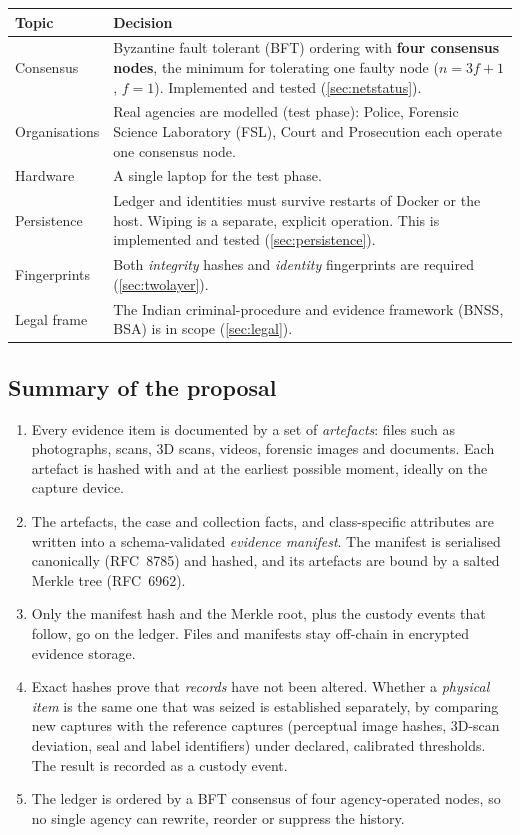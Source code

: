 \begin{center}
\begin{tabularx}{\linewidth}{@{}lX@{}}
\toprule
Topic & Decision \\
\midrule
Consensus & Byzantine fault tolerant (BFT) ordering with \textbf{four consensus nodes}, the minimum for tolerating one faulty node ($n = 3f+1$, $f=1$). Implemented and tested (\cref{sec:netstatus}). \\
Organisations & Real agencies are modelled (test phase): Police, Forensic Science Laboratory (FSL), Court and Prosecution each operate one consensus node. \\
Hardware & A single laptop for the test phase. \\
Persistence & Ledger and identities must survive restarts of Docker or the host. Wiping is a separate, explicit operation. This is implemented and tested (\cref{sec:persistence}). \\
Fingerprints & Both \emph{integrity} hashes and \emph{identity} fingerprints are required (\cref{sec:twolayer}). \\
Legal frame & The Indian criminal-procedure and evidence framework (BNSS, BSA) is in scope (\cref{sec:legal}). \\
\bottomrule
\end{tabularx}
\end{center}

\subsection{Summary of the proposal}
\begin{keypoint}
\begin{enumerate}[nosep,leftmargin=*]
  \item Every evidence item is documented by a set of \emph{artefacts}: files such as photographs, scans, 3D scans, videos, forensic images and documents. Each artefact is hashed with \shatwo{} and \shathree{} at the earliest possible moment, ideally on the capture device.
  \item The artefacts, the case and collection facts, and class-specific attributes are written into a schema-validated \emph{evidence manifest}. The manifest is serialised canonically (RFC~8785) and hashed, and its artefacts are bound by a salted Merkle tree (RFC~6962).
  \item Only the manifest hash and the Merkle root, plus the custody events that follow, go on the ledger. Files and manifests stay off-chain in encrypted evidence storage.
  \item Exact hashes prove that \emph{records} have not been altered. Whether a \emph{physical item} is the same one that was seized is established separately, by comparing new captures with the reference captures (perceptual image hashes, 3D-scan deviation, seal and label identifiers) under declared, calibrated thresholds. The result is recorded as a custody event.
  \item The ledger is ordered by a BFT consensus of four agency-operated nodes, so no single agency can rewrite, reorder or suppress the history.
\end{enumerate}
\end{keypoint}

